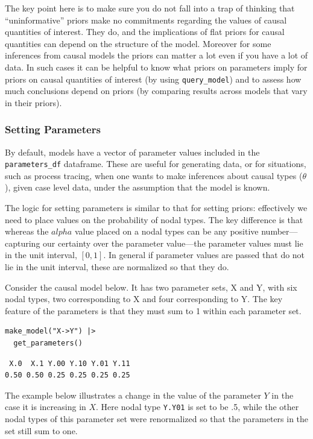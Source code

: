 \documentclass[
  article]{jss}
\begin{document}
The key point here is to make sure you do not fall into a trap of
thinking that ``uninformative'' priors make no commitments regarding the
values of causal quantities of interest. They do, and the implications
of flat priors for causal quantities can depend on the structure of the
model. Moreover for some inferences from causal models the priors can
matter a lot even if you have a lot of data. In such cases it can be
helpful to know what priors on parameters imply for priors on causal
quantities of interest (by using \texttt{query\_model}) and to assess
how much conclusions depend on priors (by comparing results across
models that vary in their priors).

\hypertarget{parameters}{%
\subsubsection{Setting Parameters}\label{parameters}}

By default, models have a vector of parameter values included in the
\texttt{parameters\_df} dataframe. These are useful for generating data,
or for situations, such as process tracing, when one wants to make
inferences about causal types (\(\theta\)), given case level data, under
the assumption that the model is known.

The logic for setting parameters is similar to that for setting priors:
effectively we need to place values on the probability of nodal types.
The key difference is that whereas the \(alpha\) value placed on a nodal
types can be any positive number---capturing our certainty over the
parameter value---the parameter values must lie in the unit interval,
\([0,1]\). In general if parameter values are passed that do not lie in
the unit interval, these are normalized so that they do.

Consider the causal model below. It has two parameter sets, X and Y,
with six nodal types, two corresponding to X and four corresponding to
Y. The key feature of the parameters is that they must sum to 1 within
each parameter set.

\begin{verbatim}
make_model("X->Y") |> 
  get_parameters()
\end{verbatim}

\begin{verbatim}
 X.0  X.1 Y.00 Y.10 Y.01 Y.11 
0.50 0.50 0.25 0.25 0.25 0.25 
\end{verbatim}

The example below illustrates a change in the value of the parameter
\(Y\) in the case it is increasing in \(X\). Here nodal type
\texttt{Y.Y01} is set to be .5, while the other nodal types of this
parameter set were renormalized so that the parameters in the set still
sum to one.
\end{document}
